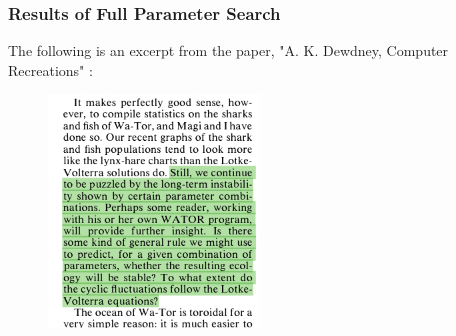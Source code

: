 \documentclass{beamer}
\begin{document}
\frame
{
	\frametitle{Results of Full Parameter Search}
	  The following is an excerpt from the paper, "A. K. Dewdney, Computer Recreations"  :
	  \begin{figure}[H]
  		\centering
		\includegraphics[width = 0.5\textwidth]{./pics/paper_predatorprey.png}
        \label{refpaper}
  \end{figure}
}
\end{document}
